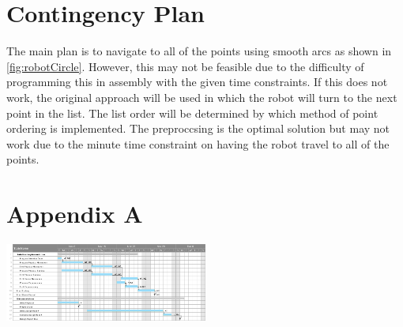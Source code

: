 \documentclass[11pt,conference,onecolumn]{article} %
\begin{document}
\section*{Contingency Plan}
The main plan is to navigate to all of the points using smooth arcs as shown in \cref{fig:robotCircle}. However, this may not be feasible due to the difficulty of programming this in assembly with the given time constraints. If this does not work, the original approach will be used in which the robot will turn to the next point in the list. The list order will be determined by which method of point ordering is implemented. The preproccsing is the optimal solution but may not work due to the minute time constraint on having the robot travel to all of the points. 

\pagebreak
\section*{Appendix A}
  \includegraphics[angle=90,origin=c,width=0.5\textwidth]{images/GanttChart.PNG}
\end{document}
